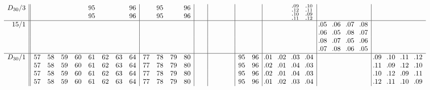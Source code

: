 \documentclass[12pt,a4paper]{amsart}
\begin{document}
\begin{align*}
\begin{array}{r||cccccccc|cccc|cc|cccc|cc|cccc|cccc|cccc}
D_{30}/3&
  &  &  &  &95&  &  &96&  &95&  &96&  &  &  &  &  &  &  &  &  &  &^{\llap{.}09}_{\llap{.}12}&^{\llap{.}10}_{\llap{.}11}&&&&&&&&\\
&
  &  &  &  &95&  &  &96&  &95&  &96&  &  &  &  &  &  &  &  &  &  &^{\llap{.}10}_{\llap{.}11}&^{\llap{.}09}_{\llap{.}12}&&&&&&&&\\ \hline
15/1&
  &  &  &  &  &  &  &  &  &  &  &  &  &  &  &  &  &  &  &  &  &  &  &  &\llap{.}05&\llap{.}06&\llap{.}07&\llap{.}08&&&&\\
&
  &  &  &  &  &  &  &  &  &  &  &  &  &  &  &  &  &  &  &  &  &  &  &  &\llap{.}06&\llap{.}05&\llap{.}08&\llap{.}07&&&&\\
&
  &  &  &  &  &  &  &  &  &  &  &  &  &  &  &  &  &  &  &  &  &  &  &  &\llap{.}08&\llap{.}07&\llap{.}05&\llap{.}06&&&&\\
&
  &  &  &  &  &  &  &  &  &  &  &  &  &  &  &  &  &  &  &  &  &  &  &  &\llap{.}07&\llap{.}08&\llap{.}06&\llap{.}05&&&&\\ \hline
D_{30}/1&
57&58&59&60&61&62&63&64&77&78&79&80&  &  &  &  &  &  &95&96&\llap{.}01&\llap{.}02&\llap{.}03&\llap{.}04&  &  &  &  &\llap{.}09&\llap{.}10&\llap{.}11&\llap{.}12\\
&
57&58&59&60&61&62&63&64&77&78&79&80&  &  &  &  &  &  &95&96&\llap{.}02&\llap{.}01&\llap{.}04&\llap{.}03&  &  &  &  &\llap{.}11&\llap{.}09&\llap{.}12&\llap{.}10\\
&
57&58&59&60&61&62&63&64&77&78&79&80&  &  &  &  &  &  &95&96&\llap{.}02&\llap{.}01&\llap{.}04&\llap{.}03&  &  &  &  &\llap{.}10&\llap{.}12&\llap{.}09&\llap{.}11\\
&
57&58&59&60&61&62&63&64&77&78&79&80&  &  &  &  &  &  &95&96&\llap{.}01&\llap{.}02&\llap{.}03&\llap{.}04&  &  &  &  &\llap{.}12&\llap{.}11&\llap{.}10&\llap{.}09\\
\end{array}
\end{align*}
\end{document}
